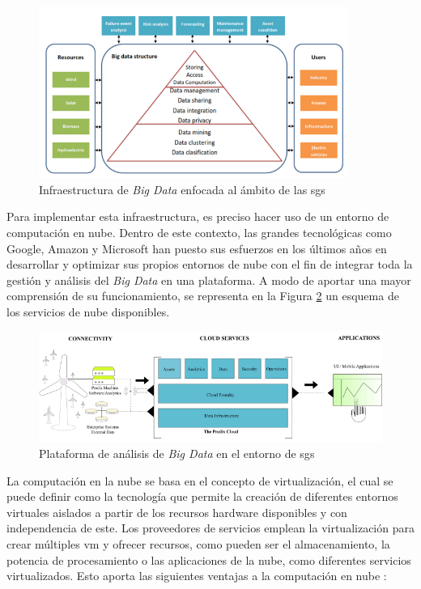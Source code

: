 \begin{figure}[h!]
  \centering
  \includegraphics[width=0.9\textwidth]{img/teoria/bigdata2.png}
  \caption{Infraestructura de \textit{Big Data} enfocada al ámbito de las \acrshort{sg}s \cite{stab}}
  \label{fig:bigdata2}
\end{figure}

Para implementar esta infraestructura, es preciso hacer uso de un entorno de computación en nube. Dentro de este contexto, las grandes tecnológicas como Google, Amazon y Microsoft han puesto sus esfuerzos en los últimos años en desarrollar y optimizar sus propios entornos de nube con el fin de integrar toda la gestión y análisis del \textit{Big Data} en una plataforma. A modo de aportar una mayor comprensión de su funcionamiento, se representa en la Figura \ref{fig:bigdata} un esquema de los servicios de nube disponibles.

\begin{figure}[h!]
  \centering
  \includegraphics[width=1\textwidth]{img/teoria/bigdata.png}
  \caption{Plataforma de análisis de \textit{Big Data} en el entorno de \acrshort{sg}s \cite{bigdata}}
  \label{fig:bigdata}
\end{figure}

\vspace{3mm}

La computación en la nube se basa en el concepto de virtualización, el cual se puede definir como la tecnología que permite la creación de diferentes entornos virtuales aislados a partir de los recursos hardware disponibles y con independencia de este. Los proveedores de servicios emplean la virtualización para crear múltiples \gls{vm} y ofrecer recursos, como pueden ser el almacenamiento, la potencia de procesamiento o las aplicaciones de la nube, como diferentes servicios virtualizados. Esto aporta las siguientes ventajas a la computación en nube \cite{bigdata} \cite{virt}:

